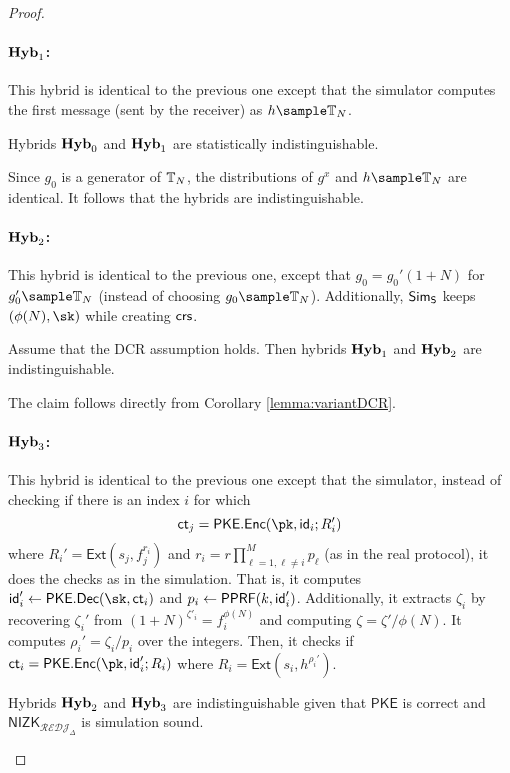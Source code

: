 \begin{proof}
\paragraph{$\mathsf{\mathbf{Hyb}}_1$:} This hybrid is identical to the previous one except that the simulator computes the first message (sent by the receiver) as $h\sample\TT_N$.

\begin{claim}
Hybrids $\mathsf{\mathbf{Hyb}}_0$ and $\mathsf{\mathbf{Hyb}}_1$ are statistically indistinguishable.
\end{claim}
Since $g_0$ is a generator of $\mathbb{T}_N$, the distributions of $g^x$ and $h\sample \TT_N$ are identical. It follows that the hybrids are indistinguishable.


\paragraph{$\mathsf{\mathbf{Hyb}}_2$:} This hybrid is identical to the previous one, except that $g_0=g_0'(1+N)$ for $g_0'\sample \TT_N$ (instead of choosing $g_0\sample \TT_N$). Additionally, $\mathsf{Sim}_{\mathsf{S}}$ keeps $(\phi(N),\sk)$ while creating $\mathsf{crs}$. %

\begin{claim}
Assume that the DCR assumption holds. Then hybrids $\mathsf{\mathbf{Hyb}}_1$ and $\mathsf{\mathbf{Hyb}}_2$ are indistinguishable.
\end{claim}
 The claim follows directly from Corollary \ref{lemma:variantDCR}.

\paragraph{$\mathsf{\mathbf{Hyb}}_3$:} This hybrid is identical to the previous one except that the simulator, instead of checking if there is an index $i$ for which $$\ct_j=\mathsf{PKE.Enc}(\pk,\id_i;R'_i)$$ where $R_i'=\mathsf{Ext}(s_j,f_j^{r_i})$ and $r_i={r \displaystyle\prod_{
         \ell=1,
        \ell\neq i
     }^M p_\ell}$ (as in the real protocol), it does the checks as in the simulation. That is, it computes $\id'_i\leftarrow\mathsf{PKE.Dec}(\sk,\ct_i)$ and $p_i\leftarrow\mathsf{PPRF}(k,\mathsf{id}'_i)$. Additionally, it extracts $\zeta_i$ by  recovering $ \zeta_i'$ from $(1+N)^{\zeta'_i}=f_i^{\phi(N)}$ and computing $\zeta=\zeta'/\phi(N)$. It computes $\rho_i'=\zeta_i/p_i$ over the integers. Then, it checks if $\ct_i=\mathsf{PKE.Enc}(\pk,\id'_i;R_i)$ where $R_i=\mathsf{Ext}(s_i,h^{\rho_i'})$.
     
\begin{claim}
Hybrids $\mathsf{\mathbf{Hyb}}_2$ and $\mathsf{\mathbf{Hyb}}_3$ are indistinguishable given that $\mathsf{PKE}$ is correct and $\mathsf{NIZK}_{\mathcal{REDJ}_\Delta}$ is simulation sound.
\end{claim}     


\end{proof}
